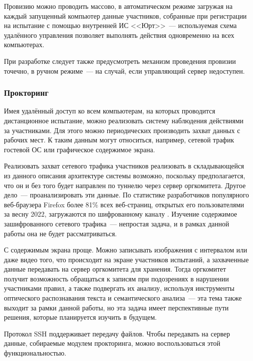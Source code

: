 Провизию можно проводить массово, в автоматическом режиме загружая на каждый запущенный компьютер данные участников, собранные при регистрации на испытание с помощью внутренней ИС <<Юрт>>~--- используемая схема удалённого управления позволяет выполнять действия одновременно на всех компьютерах.

При разработке следует также предусмотреть механизм проведения провизии точечно, в ручном режиме~--- на случай, если управляющий сервер недоступен.


\subsubsection{Прокторинг}

Имея удалённый доступ ко всем компьютерам, на которых проводится дистанционное испытание, можно реализовать систему наблюдения действиями за участниками. Для этого можно периодических производить захват данных с рабочих мест. К таким данным могут относиться, например, сетевой трафик гостевой ОС или графическое содержимое экрана.

Реализовать захват сетевого трафика участников реализовать в складывающейся из данного описания архитектуре системы возможно, поскольку предполагается, что он и без того будет направлен по туннелю через сервер оргкомитета. Другое дело~--- проанализировать эти данные. По статистике разработчиков популярного веб-браузера Firefox более 81\% всех веб-страниц, открытых его пользователями за весну 2022, загружаются по шифрованному каналу \cite{FirefoxHTTPS}. Изучение содержимое зашифрованного сетевого трафика~--- непростая задача, и в рамках данной работы она не будет рассматриваться.

С содержимым экрана проще. Можно записывать изображения с интервалом или даже видео того, что происходит на экране участников испытаний, а захваченные данные передавать на сервер оргкомитета для хранения. Тогда оргкомитет получит возможность обращаться к записям при подозрениях в нарушении участниками правил, а также подвергать их анализу, используя инструменты оптического распознавания текста и семантического анализа~--- эта тема также выходит за рамки данной работы, но эта задача имеет перспективные пути решения, которые планируется изучить в будущем.

Протокол SSH поддерживает передачу файлов. Чтобы передавать на сервер данные, собираемые модулем прокторинга, можно воспользоваться этой функциональностью.



